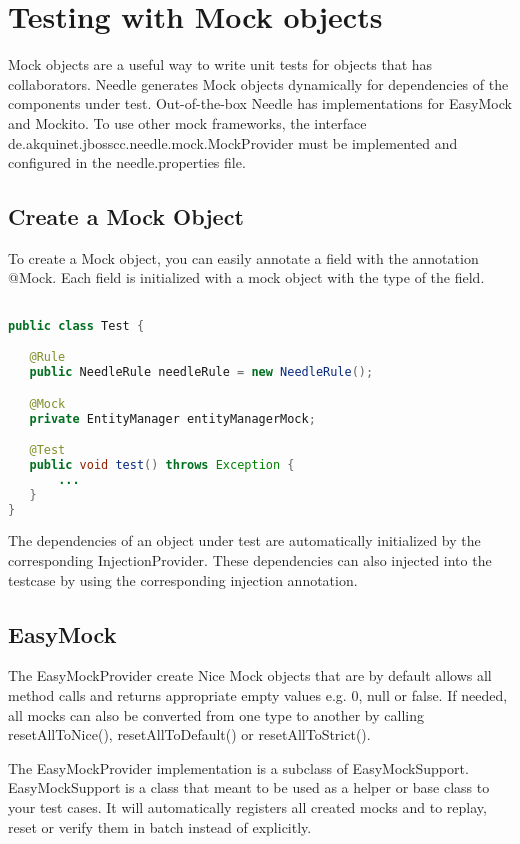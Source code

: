 \chapter{Testing with Mock objects}
Mock objects are a useful way to write unit tests for objects that has collaborators. Needle generates Mock objects dynamically for dependencies of the components under test.
Out-of-the-box Needle has implementations for EasyMock and Mockito.
To use other mock frameworks, the interface de.akquinet.jbosscc.needle.mock.MockProvider must be implemented and configured in the needle.properties file.

\section{Create a Mock Object}

To create a Mock object, you can easily annotate a field with the annotation @Mock.
Each field is initialized with a mock object with the type of the field.

\begin{lstlisting}[language={JAVA},caption=Mock annotation]

public class Test {

   @Rule
   public NeedleRule needleRule = new NeedleRule();

   @Mock
   private EntityManager entityManagerMock;

   @Test
   public void test() throws Exception {
       ...
   }
}

\end{lstlisting}

The dependencies of an object under test are automatically initialized by the corresponding InjectionProvider.
These dependencies can also injected into the testcase by using the corresponding injection annotation.

\section{EasyMock}

The EasyMockProvider create Nice Mock objects that are by default allows all method calls and returns appropriate empty values e.g. 0, null or false.
If needed, all mocks can also be converted from one type to another by calling resetAllToNice(), resetAllToDefault() or resetAllToStrict().

The EasyMockProvider implementation is a subclass of EasyMockSupport. EasyMockSupport is a class that meant to be used as a helper or base class to your test cases.
It will automatically registers all created mocks and to replay, reset or verify them in batch instead of explicitly.


